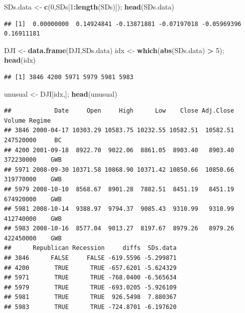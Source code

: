 \documentclass[]{article}
\newenvironment{Shaded}{\begin{snugshade}}{\end{snugshade}}
\newcommand{\DecValTok}[1]{\textcolor[rgb]{0.00,0.00,0.81}{#1}}
\newcommand{\KeywordTok}[1]{\textcolor[rgb]{0.13,0.29,0.53}{\textbf{#1}}}
\newcommand{\NormalTok}[1]{#1}
\newcommand{\OperatorTok}[1]{\textcolor[rgb]{0.81,0.36,0.00}{\textbf{#1}}}
\newcommand{\StringTok}[1]{\textcolor[rgb]{0.31,0.60,0.02}{#1}}
\begin{document}
\begin{Shaded}
\begin{Highlighting}[]
\NormalTok{SDs.data <-}\StringTok{ }\KeywordTok{c}\NormalTok{(}\DecValTok{0}\NormalTok{,SDs[}\DecValTok{1}\OperatorTok{:}\KeywordTok{length}\NormalTok{(SDs)]); }\KeywordTok{head}\NormalTok{(SDs.data) }
\end{Highlighting}
\end{Shaded}

\begin{verbatim}
## [1]  0.00000000  0.14924841 -0.13871881 -0.07197018 -0.05969396  0.16911181
\end{verbatim}

\begin{Shaded}
\begin{Highlighting}[]
\NormalTok{DJI <-}\StringTok{ }\KeywordTok{data.frame}\NormalTok{(DJI,SDs.data)}
\NormalTok{idx <-}\StringTok{ }\KeywordTok{which}\NormalTok{(}\KeywordTok{abs}\NormalTok{(SDs.data) }\OperatorTok{>}\StringTok{ }\DecValTok{5}\NormalTok{); }\KeywordTok{head}\NormalTok{(idx)}
\end{Highlighting}
\end{Shaded}

\begin{verbatim}
## [1] 3846 4200 5971 5979 5981 5983
\end{verbatim}

\begin{Shaded}
\begin{Highlighting}[]
\NormalTok{unusual <-}\StringTok{ }\NormalTok{DJI[idx,]; }\KeywordTok{head}\NormalTok{(unusual) }
\end{Highlighting}
\end{Shaded}

\begin{verbatim}
##            Date     Open     High      Low    Close Adj.Close    Volume Regime
## 3846 2000-04-17 10303.29 10583.75 10232.55 10582.51  10582.51 247520000     BC
## 4200 2001-09-18  8922.70  9022.06  8861.05  8903.40   8903.40 372230000    GWB
## 5971 2008-09-30 10371.58 10868.90 10371.42 10850.66  10850.66 319770000    GWB
## 5979 2008-10-10  8568.67  8901.28  7882.51  8451.19   8451.19 674920000    GWB
## 5981 2008-10-14  9388.97  9794.37  9085.43  9310.99   9310.99 412740000    GWB
## 5983 2008-10-16  8577.04  9013.27  8197.67  8979.26   8979.26 422450000    GWB
##      Republican Recession     diffs  SDs.data
## 3846      FALSE     FALSE -619.5596 -5.299871
## 4200       TRUE      TRUE -657.6201 -5.624329
## 5971       TRUE      TRUE -768.0400 -6.565634
## 5979       TRUE      TRUE -693.0205 -5.926109
## 5981       TRUE      TRUE  926.5498  7.880367
## 5983       TRUE      TRUE -724.8701 -6.197620
\end{verbatim}
\end{document}
